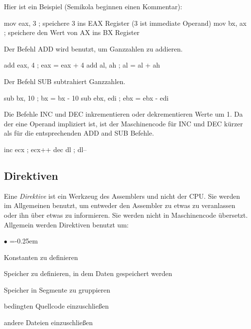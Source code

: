 Hier ist ein Beispiel (Semikola beginnen einen
Kommentar):
\begin{AsmCodeListing}[frame=none, numbers=left]
      mov    eax, 3      ; speichere 3 ins EAX Register (3 ist immediate Operand)
      mov    bx, ax      ; speichere den Wert von AX ins BX Register
\end{AsmCodeListing}

Der Befehl {\code ADD}  wird benutzt, um
Ganzzahlen zu addieren.
\begin{AsmCodeListing}[frame=none, numbers=left, firstnumber=last]
      add    eax, 4      ; eax = eax + 4
      add    al, ah      ; al = al + ah
\end{AsmCodeListing}

Der Befehl {\code SUB}  subtrahiert
Ganzzahlen.
\begin{AsmCodeListing}[frame=none, numbers=left, firstnumber=last]
      sub    bx, 10      ; bx = bx - 10
      sub    ebx, edi    ; ebx = ebx - edi
\end{AsmCodeListing}

Die Befehle {\code INC}  und {\code DEC}
 inkrementieren oder dekrementieren Werte
um 1. Da der eine Operand impliziert ist, ist der Maschinencode f\"{u}r
{\code INC} und {\code DEC} k\"{u}rzer als f\"{u}r die entsprechenden {\code
ADD} and {\code SUB} Befehle.
\begin{AsmCodeListing}[frame=none, numbers=left, firstnumber=last]
      inc    ecx         ; ecx++
      dec    dl          ; dl--
\end{AsmCodeListing}

\subsection{Direktiven}

Eine \emph{Direktive} ist ein Werkzeug des Assemblers und nicht der
CPU\@. Sie werden im Allgemeinen benutzt, um entweder den Assembler
zu etwas zu veranlassen oder ihn \"{u}ber etwas zu informieren. Sie
werden nicht in Maschinencode \"{u}bersetzt. Allgemein werden Direktiven
benutzt um:
\begin{list}{$\bullet$}{}
\parskip=-0.25em %

\item Konstanten zu definieren

\item Speicher zu definieren, in dem Daten gespeichert werden

\item Speicher in Segmente zu gruppieren

\item bedingten Quellcode einzuschlie{\ss}en

\item andere Dateien einzuschlie{\ss}en
\end{list}

